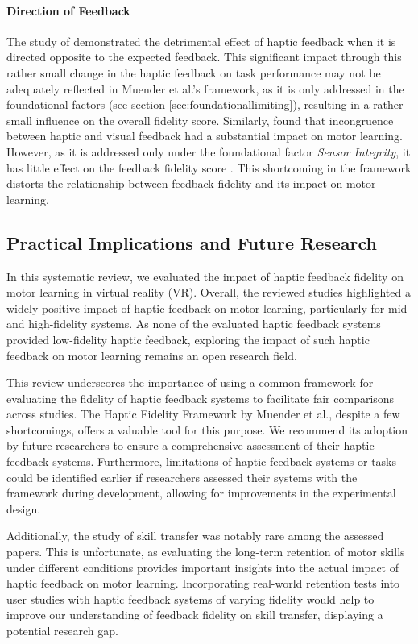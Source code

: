 \paragraph{Direction of Feedback}
The study of \cite{Macuga2019} demonstrated the detrimental effect of haptic feedback when it is directed opposite to the expected feedback. This significant impact through this rather small change in the haptic feedback on task performance may not be adequately reflected in Muender et al.'s framework, as it is only addressed in the foundational factors (see section \ref{sec:foundationallimiting}), resulting in a rather small influence on the overall fidelity score. Similarly, \cite{Mohanty2023} found that incongruence between haptic and visual feedback had a substantial impact on motor learning. However, as it is addressed only under the foundational factor \textit{Sensor Integrity}, it has little effect on the feedback fidelity score \cite{Muender2022HapticReality}. This shortcoming in the framework distorts the relationship between feedback fidelity and its impact on motor learning.


\subsection{Practical Implications and Future Research}
In this systematic review, we evaluated the impact of haptic feedback fidelity on motor learning in virtual reality (VR). Overall, the reviewed studies highlighted a widely positive impact of haptic feedback on motor learning, particularly for mid- and high-fidelity systems. As none of the evaluated haptic feedback systems provided low-fidelity haptic feedback, exploring the impact of such haptic feedback on motor learning remains an open research field.

This review underscores the importance of using a common framework for evaluating the fidelity of haptic feedback systems to facilitate fair comparisons across studies. The Haptic Fidelity Framework by Muender et al., despite a few shortcomings, offers a valuable tool for this purpose. We recommend its adoption by future researchers to ensure a comprehensive assessment of their haptic feedback systems. Furthermore, limitations of haptic feedback systems or tasks could be identified earlier if researchers assessed their systems with the framework during development, allowing for improvements in the experimental design.

Additionally, the study of skill transfer was notably rare among the assessed papers. This is unfortunate, as evaluating the long-term retention of motor skills under different conditions provides important insights into the actual impact of haptic feedback on motor learning. Incorporating real-world retention tests into user studies with haptic feedback systems of varying fidelity would help to improve our understanding of feedback fidelity on skill transfer, displaying a potential research gap.

